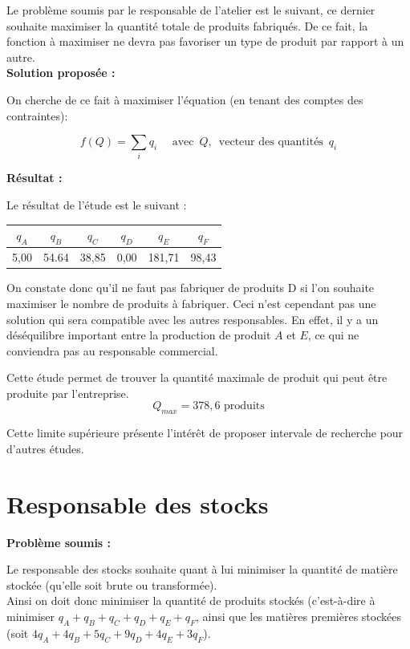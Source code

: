 \documentclass[paper=a4, fontsize=11pt]{report}
\numberwithin{equation}{section}		%
\numberwithin{figure}{section}			%
\numberwithin{table}{section}				%
\renewcommand{\bf}[1]{\textbf{#1}}
\begin{document}
Le problème soumis par le responsable de l'atelier est le suivant, ce dernier souhaite maximiser la quantité totale de produits fabriqués. De ce fait, la fonction à maximiser ne devra pas favoriser un type de produit par rapport à un autre.\\

\bf{Solution proposée :}

On cherche de ce fait à maximiser l'équation (en tenant des comptes des contraintes):

\[f(Q) = \sum_i q_i \quad \text{  avec } \, Q, \, \text{ vecteur des quantités } \, q_i \]

\bf{Résultat :}

Le résultat de l'étude est le suivant : 

\begin{center}
\begin{tabular}{cccccc}
\hline 
$q_A$ & $q_B$ & $q_C$ & $q_D$ & $q_E$ & $q_F$ \\ 
\hline 
5,00 & 54.64 & 38,85 & 0,00 & 181,71 & 98,43 \\ 
\hline 
\end{tabular} 
\end{center}

On constate donc qu'il ne faut pas fabriquer de produits D si l'on souhaite maximiser le nombre de produits à fabriquer. Ceci n'est cependant pas une solution qui sera compatible avec les autres responsables. En effet, il y a un déséquilibre important entre la production de produit $A$ et $E$, ce qui ne conviendra pas au responsable commercial.

Cette étude permet de trouver la quantité maximale de produit qui peut être produite par l'entreprise.
\[ Q_{max} = 378,6 \text{ produits}\]

Cette limite supérieure présente l'intérêt de proposer intervale de recherche pour d'autres études.


\section{Responsable des stocks}
\bf{Problème soumis :}

Le responsable des stocks souhaite quant à lui minimiser la quantité de matière stockée (qu'elle soit brute ou transformée).\\

Ainsi on doit donc minimiser la quantité de produits stockés (c'est-à-dire à minimiser $q_A + q_B + q_C + q_D + q_E + q_F$, ainsi que les matières premières stockées (soit $4q_A + 4q_B + 5q_C + 9q_D + 4q_E + 3q_F$).
\\
\end{document}
